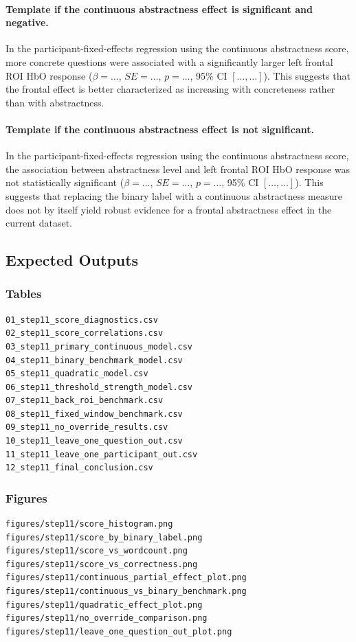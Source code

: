 \paragraph{Template if the continuous abstractness effect is significant and negative.}
In the participant-fixed-effects regression using the continuous abstractness score, more concrete
questions were associated with a significantly larger left frontal ROI HbO response
(\(\beta=\ldots\), \(SE=\ldots\), \(p=\ldots\), 95\% CI \([\ldots,\ldots]\)).
This suggests that the frontal effect is better characterized as increasing with concreteness rather
than with abstractness.

\paragraph{Template if the continuous abstractness effect is not significant.}
In the participant-fixed-effects regression using the continuous abstractness score, the association
between abstractness level and left frontal ROI HbO response was not statistically significant
(\(\beta=\ldots\), \(SE=\ldots\), \(p=\ldots\), 95\% CI \([\ldots,\ldots]\)).
This suggests that replacing the binary label with a continuous abstractness measure does not by itself
yield robust evidence for a frontal abstractness effect in the current dataset.

\subsection{Expected Outputs}

\subsubsection*{Tables}
\begin{verbatim}
01_step11_score_diagnostics.csv
02_step11_score_correlations.csv
03_step11_primary_continuous_model.csv
04_step11_binary_benchmark_model.csv
05_step11_quadratic_model.csv
06_step11_threshold_strength_model.csv
07_step11_back_roi_benchmark.csv
08_step11_fixed_window_benchmark.csv
09_step11_no_override_results.csv
10_step11_leave_one_question_out.csv
11_step11_leave_one_participant_out.csv
12_step11_final_conclusion.csv
\end{verbatim}

\subsubsection*{Figures}
\begin{verbatim}
figures/step11/score_histogram.png
figures/step11/score_by_binary_label.png
figures/step11/score_vs_wordcount.png
figures/step11/score_vs_correctness.png
figures/step11/continuous_partial_effect_plot.png
figures/step11/continuous_vs_binary_benchmark.png
figures/step11/quadratic_effect_plot.png
figures/step11/no_override_comparison.png
figures/step11/leave_one_question_out_plot.png
\end{verbatim}

